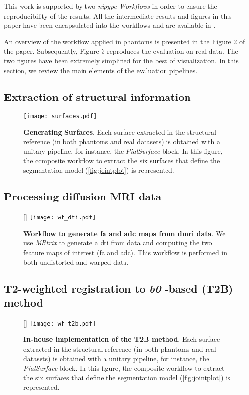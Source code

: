 \documentclass[a4paper]{report}
\begin{document}
This work is supported by two \emph{nipype Workflows} in order to ensure the reproducibility
  of the results.
All the intermediate results and figures in this paper have been encapsulated into
  the workflows and are available in \citep{esteban_acweregistration_2015}.

An overview of the workflow applied in phantoms is presented in the Figure 2 of the paper.
Subsequently, Figure 3 reproduces the evaluation on real data.
The two figures have been extremely simplified for the best of visualization.
In this section, we review the main elements of the evaluation pipelines.

\subsection{Extraction of structural information}
\begin{figure}[!ht]
  \texttt{[image: surfaces.pdf]}
  \caption{\textbf{Generating Surfaces}.
  Each surface extracted in the structural reference
    (in both phantoms and real datasets) is obtained with a unitary pipeline,
    for instance, the \emph{PialSurface} block.
  In this figure, the composite workflow to extract the six surfaces that define the
    segmentation model (\autoref{fig:jointplot}) is represented.
  }\label{fig:wf_surfaces}
\end{figure}

\subsection{Processing diffusion MRI data}
\begin{figure}[!ht]
  [\FBwidth]
  {\texttt{[image: wf\_dti.pdf]}}
  {\caption{\textbf{Workflow to generate \gls*{fa} and \gls*{adc} maps from \gls*{dmri} data}.
    We use \emph{MRtrix} \citep{tournier_mrtrix_2012} to generate a \gls*{dti} from data and
      computing the two feature maps of interest (\gls*{fa} and \gls*{adc}).
    This workflow is performed in both undistorted and warped data.}\label{fig:wf_dti}}
\end{figure}

\subsection{T2-weighted registration to \emph{b0} -based (T2B) method}
\begin{figure}[!ht]
  [\FBwidth]
  {\texttt{[image: wf\_t2b.pdf]}}
  {\caption{\textbf{In-house implementation of the T2B method}.
    Each surface extracted in the structural reference
      (in both phantoms and real datasets) is obtained with a unitary pipeline,
      for instance, the \emph{PialSurface} block.
    In this figure, the composite workflow to extract the six surfaces that define the
      segmentation model (\autoref{fig:jointplot}) is represented.}\label{fig:wf_t2b}}
\end{figure}
\end{document}
